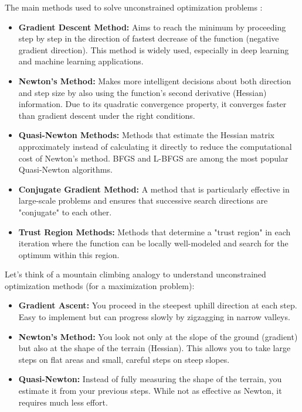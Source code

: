 The main methods used to solve unconstrained optimization problems :

\begin{itemize}
    \item \textbf{Gradient Descent Method:} Aims to reach the minimum by proceeding step by step in the direction of fastest decrease of the function (negative gradient direction). This method is widely used, especially in deep learning and machine learning applications.
    
    \item \textbf{Newton's Method:} Makes more intelligent decisions about both direction and step size by also using the function's second derivative (Hessian) information. Due to its quadratic convergence property, it converges faster than gradient descent under the right conditions.
    
    \item \textbf{Quasi-Newton Methods:} Methods that estimate the Hessian matrix approximately instead of calculating it directly to reduce the computational cost of Newton's method. BFGS and L-BFGS are among the most popular Quasi-Newton algorithms.
    
    \item \textbf{Conjugate Gradient Method:} A method that is particularly effective in large-scale problems and ensures that successive search directions are "conjugate" to each other.
    
    \item \textbf{Trust Region Methods:} Methods that determine a "trust region" in each iteration where the function can be locally well-modeled and search for the optimum within this region.
\end{itemize}

\begin{tcolorbox}[title=Mountain Climbing Analogy]
Let's think of a mountain climbing analogy to understand unconstrained optimization methods (for a maximization problem):

\begin{itemize}
    \item \textbf{Gradient Ascent:} You proceed in the steepest uphill direction at each step. Easy to implement but can progress slowly by zigzagging in narrow valleys.
    
    \item \textbf{Newton's Method:} You look not only at the slope of the ground (gradient) but also at the shape of the terrain (Hessian). This allows you to take large steps on flat areas and small, careful steps on steep slopes.
    
    \item \textbf{Quasi-Newton:} Instead of fully measuring the shape of the terrain, you estimate it from your previous steps. While not as effective as Newton, it requires much less effort.
\end{itemize}
\end{tcolorbox}

